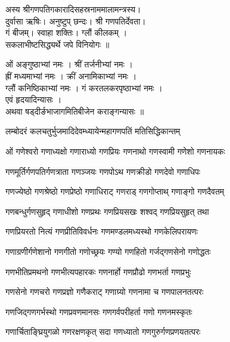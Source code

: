 

अस्य श्रीगणपतिगकारादिसहस्रनाममालामन्त्रस्य।\\
दुर्वासा ऋषिः। अनुष्टुप् छन्दः। श्री गणपतिर्देवता।\\
गं बीजम्। स्वाहा शक्तिः। ग्लौं कीलकम् ।\\
 सकलाभीष्टसिद्ध्यर्थे जपे विनियोगः ॥

ओं अङ्गुष्ठाभ्यां नमः । श्रीं तर्जनीभ्यां नमः ।\\
ह्रीं मध्यमाभ्यां नमः । क्रीं अनामिकाभ्यां नमः ।\\
 ग्लौं कनिष्ठिकाभ्यां नमः । गं करतलकरपृष्ठाभ्यां नमः ।\\
 एवं हृदयादिन्यासः । \\
अथवा षड्दीर्ङभाजागमितिबीजेन कराङ्गन्यासः ॥


{लम्बोदरं कलचतुर्भुजमादिदेवम्}{ध्यायेन्महागणपतिं मतिसिद्धिकान्तम्}


\twolineshloka
{ओं गणेश्वरो गणाध्यक्षो गणाराध्यो गणप्रियः}
{गणनाथो गणस्वामी गणेशो गणनायकः}%

\twolineshloka
{गणमूर्तिर्गणपतिर्गणत्राता गणञ्जयः}%
{गणपोऽथ गणक्रीडो गणदेवो गणाधिपः}%

\twolineshloka
{गणज्येष्ठो गणश्रेष्ठो गणप्रेष्ठो गणाधिराट्}%
{गणराड् गणगोप्ताथ् गणाङ्गो गणदैवतम्}%

\twolineshloka
{गणबन्धुर्गणसुहृद् गणाधीशो गणप्रथः}%
{गणप्रियसखः शश्वद् गणप्रियसुहृत् तथा}%

\twolineshloka
{गणप्रियरतो नित्यं गणप्रीतिविवर्धनः}%
{गणमण्डलमध्यस्थो गणकेलिपरायणः}%

\twolineshloka
{गणाग्रणीर्गणेशानो गणगीतो गणोच्छ्रयः}%
{गण्यो गणहितो गर्जद्गणसेनो गणोद्धतः}%

\twolineshloka
{गणभीतिप्रमथनो गणभीत्यपहारकः}%
{गणनार्हो गणप्रौढो गणभर्ता गणप्रभुः}%

\twolineshloka
{गणसेनो गणचरो गणप्रज्ञो गणैकराट्}%
{गणाग्र्यो गणनामा च गणपालनतत्परः}%

\twolineshloka
{गणजिद्गणगर्भस्थो गणप्रवणमानसः}%
{गणगर्वपरीहर्ता गणो गणनमस्कृतः}%

\twolineshloka
{गणार्चिताङ्घ्रियुगळो गणरक्षणकृत् सदा}%
{गणध्यातो गणगुरुर्गणप्रणयतत्परः}%

